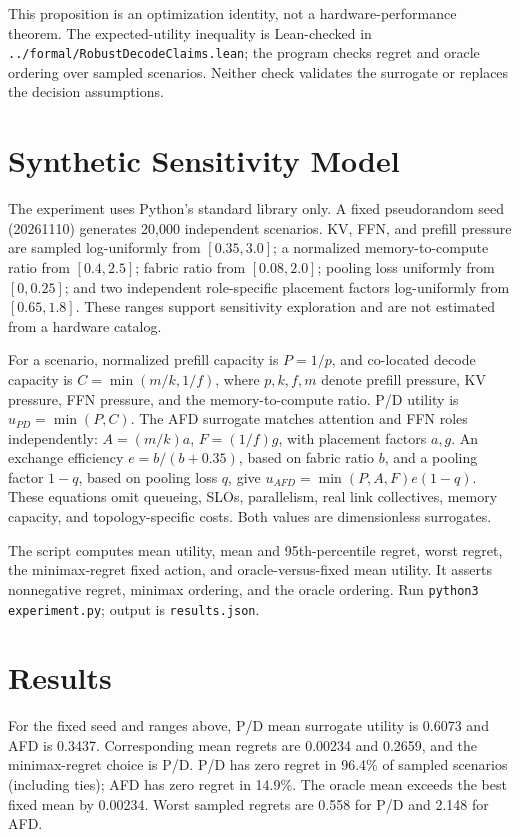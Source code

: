 \documentclass[11pt]{article}
\begin{document}
This proposition is an optimization identity, not a hardware-performance theorem. The expected-utility inequality is Lean-checked in \texttt{../formal/RobustDecodeClaims.lean}; the program checks regret and oracle ordering over sampled scenarios. Neither check validates the surrogate or replaces the decision assumptions.

\section{Synthetic Sensitivity Model}
The experiment uses Python's standard library only. A fixed pseudorandom seed (20261110) generates 20,000 independent scenarios. KV, FFN, and prefill pressure are sampled log-uniformly from $[0.35,3.0]$; a normalized memory-to-compute ratio from $[0.4,2.5]$; fabric ratio from $[0.08,2.0]$; pooling loss uniformly from $[0,0.25]$; and two independent role-specific placement factors log-uniformly from $[0.65,1.8]$. These ranges support sensitivity exploration and are not estimated from a hardware catalog.

For a scenario, normalized prefill capacity is $P=1/p$, and co-located decode capacity is $C=\min(m/k,1/f)$, where $p,k,f,m$ denote prefill pressure, KV pressure, FFN pressure, and the memory-to-compute ratio. P/D utility is $u_{PD}=\min(P,C)$. The AFD surrogate matches attention and FFN roles independently: $A=(m/k)a$, $F=(1/f)g$, with placement factors $a,g$. An exchange efficiency $e=b/(b+0.35)$, based on fabric ratio $b$, and a pooling factor $1-q$, based on pooling loss $q$, give $u_{AFD}=\min(P,A,F)e(1-q)$. These equations omit queueing, SLOs, parallelism, real link collectives, memory capacity, and topology-specific costs. Both values are dimensionless surrogates.

The script computes mean utility, mean and 95th-percentile regret, worst regret, the minimax-regret fixed action, and oracle-versus-fixed mean utility. It asserts nonnegative regret, minimax ordering, and the oracle ordering. Run \texttt{python3 experiment.py}; output is \texttt{results.json}.

\section{Results}
For the fixed seed and ranges above, P/D mean surrogate utility is 0.6073 and AFD is 0.3437. Corresponding mean regrets are 0.00234 and 0.2659, and the minimax-regret choice is P/D. P/D has zero regret in 96.4\% of sampled scenarios (including ties); AFD has zero regret in 14.9\%. The oracle mean exceeds the best fixed mean by 0.00234. Worst sampled regrets are 0.558 for P/D and 2.148 for AFD.
\end{document}

